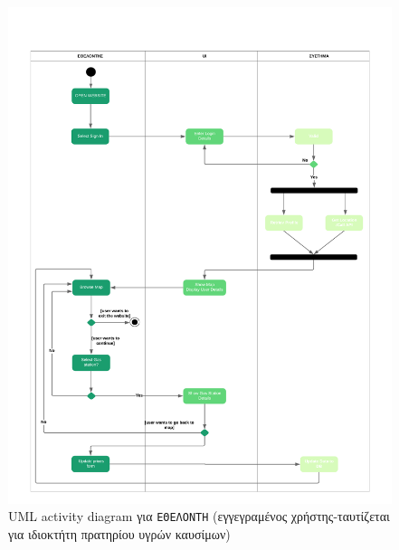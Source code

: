 \begin{figure}
	\centering\includegraphics[width = \linewidth]{uml/volunteer.png}
	\caption{UML activity diagram για \texttt{ΕΘΕΛΟΝΤΗ} (εγγεγραμένος χρήστης-ταυτίζεται για ιδιοκτήτη πρατηρίου υγρών καυσίμων)}
\end{figure}